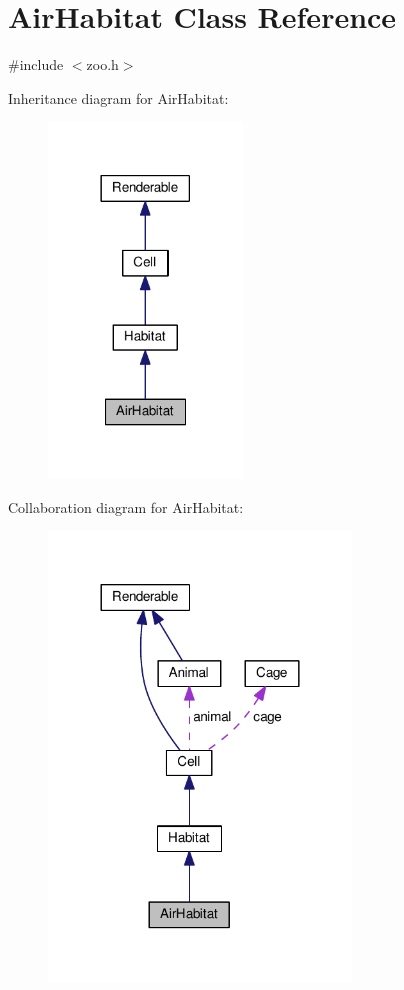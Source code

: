 \hypertarget{classAirHabitat}{}\section{Air\+Habitat Class Reference}
\label{classAirHabitat}


{\ttfamily \#include $<$zoo.\+h$>$}



Inheritance diagram for Air\+Habitat\+:
\nopagebreak
\begin{figure}[H]
\begin{center}
\leavevmode
\includegraphics[width=146pt]{classAirHabitat__inherit__graph}
\end{center}
\end{figure}


Collaboration diagram for Air\+Habitat\+:
\nopagebreak
\begin{figure}[H]
\begin{center}
\leavevmode
\includegraphics[width=228pt]{classAirHabitat__coll__graph}
\end{center}
\end{figure}

